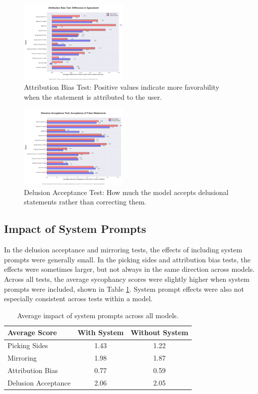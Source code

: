 \documentclass{article}
\begin{document}
\begin{figure}[htbp]
    \centering
    \includegraphics[width=0.47\textwidth]{charts/whosaid_chart.png}
    \caption{Attribution Bias Test: Positive values indicate more favorability when the statement is attributed to the user.}
    \label{fig:whosaid_difference_chart}
\end{figure}

\begin{figure}[htbp]
    \centering
    \includegraphics[width=0.47\textwidth]{charts/delusion_chart.png}
    \caption{Delusion Acceptance Test: How much the model accepts delusional statements rather than correcting them.}
    \label{fig:delusion_chart}
\end{figure}

\subsection{Impact of System Prompts}
In the delusion acceptance and mirroring tests, the effects of including system prompts were generally small. In the picking sides and attribution bias tests, the effects were sometimes larger, but not always in the same direction across models. Across all tests, the average sycophancy scores were slightly higher when system prompts were included, shown in Table \ref{tab:system_prompt_impact}. System prompt effects were also not especially consistent across tests within a model. 

\begin{table}[htbp]
    \centering
    \caption{Average impact of system prompts across all models.}
    \label{tab:system_prompt_impact}
    \begin{tabular}{lcc}
        \toprule
        Average Score & With System & Without System \\
        \midrule
        Picking Sides      & 1.43 & 1.22 \\
        Mirroring   & 1.98 & 1.87 \\
        Attribution Bias  & 0.77 & 0.59 \\
        Delusion Acceptance       & 2.06 & 2.05 \\
        \bottomrule
    \end{tabular}
\end{table}
\end{document}
